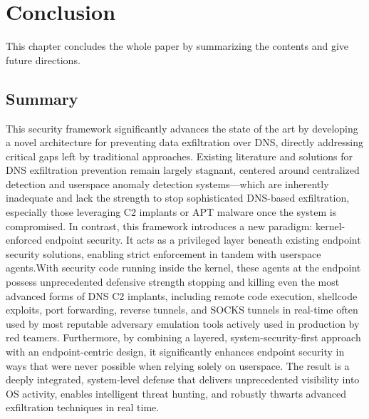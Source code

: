 \documentclass [11pt, proquest] {uwthesis}[2020/02/24]
\begin{document}


    

\chapter{Conclusion}
This chapter concludes the whole paper by summarizing the contents and give future directions.


\section{Summary}
This security framework significantly advances the state of the art by developing a novel architecture for preventing data exfiltration over DNS, directly addressing critical gaps left by traditional approaches. Existing literature and solutions for DNS exfiltration prevention remain largely stagnant, centered around centralized detection and userspace anomaly detection systems—which are inherently inadequate and lack the strength to stop sophisticated DNS-based exfiltration, especially those leveraging C2 implants or APT malware once the system is compromised. In contrast, this framework introduces a new paradigm: kernel-enforced endpoint security. It acts as a privileged layer beneath existing endpoint security solutions, enabling strict enforcement in tandem with userspace agents.With security code running inside the kernel, these agents at the endpoint possess unprecedented defensive strength stopping and killing even the most advanced forms of DNS C2 implants, including remote code execution, shellcode exploits, port forwarding, reverse tunnels, and SOCKS tunnels in real-time often used by most reputable adversary emulation tools actively used in production by red teamers.
Furthermore, by combining a layered, system-security-first approach with an endpoint-centric design, it significantly enhances endpoint security in ways that were never possible when relying solely on userspace. The result is a deeply integrated, system-level defense that delivers unprecedented visibility into OS activity, enables intelligent threat hunting, and robustly thwarts advanced exfiltration techniques in real time.
\end{document}
